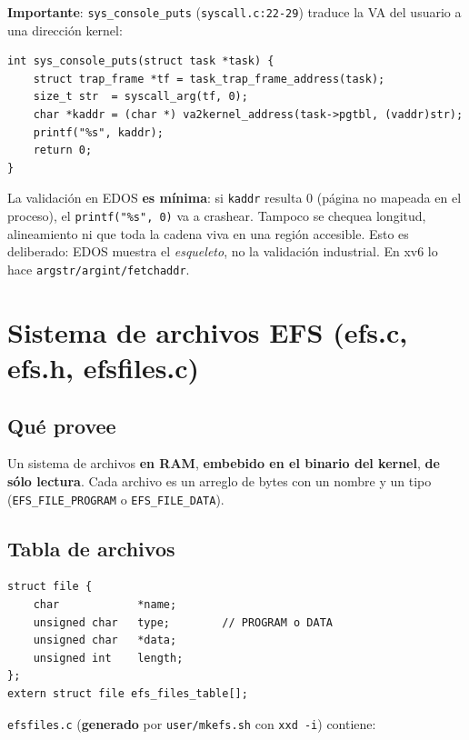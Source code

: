 \documentclass[11pt,a4paper]{article}
\begin{document}
\textbf{Importante}: \texttt{sys\_console\_puts}
(\texttt{syscall.c:22-29}) traduce la VA del usuario a una dirección
kernel:

\begin{lstlisting}[style=cstyle]
int sys_console_puts(struct task *task) {
    struct trap_frame *tf = task_trap_frame_address(task);
    size_t str  = syscall_arg(tf, 0);
    char *kaddr = (char *) va2kernel_address(task->pgtbl, (vaddr)str);
    printf("%s", kaddr);
    return 0;
}
\end{lstlisting}

\begin{importante}
La validación en EDOS \textbf{es mínima}: si \texttt{kaddr} resulta
0 (página no mapeada en el proceso), el \texttt{printf("\%s", 0)}
va a crashear. Tampoco se chequea longitud, alineamiento ni que
toda la cadena viva en una región accesible. Esto es deliberado:
EDOS muestra el \emph{esqueleto}, no la validación industrial. En
xv6 lo hace \texttt{argstr/argint/fetchaddr}.
\end{importante}

\section{Sistema de archivos EFS (efs.c, efs.h, efsfiles.c)}

\subsection*{Qué provee}

Un sistema de archivos \textbf{en RAM}, \textbf{embebido en el
binario del kernel}, \textbf{de sólo lectura}. Cada archivo es un
arreglo de bytes con un nombre y un tipo (\texttt{EFS\_FILE\_PROGRAM}
o \texttt{EFS\_FILE\_DATA}).

\subsection*{Tabla de archivos}

\begin{lstlisting}[style=cstyle]
struct file {
    char            *name;
    unsigned char   type;        // PROGRAM o DATA
    unsigned char   *data;
    unsigned int    length;
};
extern struct file efs_files_table[];
\end{lstlisting}

\texttt{efsfiles.c} (\textbf{generado} por \texttt{user/mkefs.sh}
con \texttt{xxd -i}) contiene:
\end{document}
